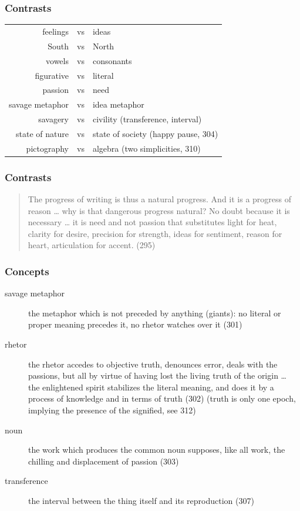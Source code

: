\documentclass[xcolor=dvipsnames]{beamer}
\begin{document}
\begin{frame}
  \frametitle{Contrasts}
  \begin{tabular}{rcl}
      feelings & vs & ideas \\
      South & vs & North \\
      vowels & vs & consonants \\
      figurative & vs & literal \\
      passion & vs & need \\
      savage metaphor & vs & idea metaphor \\
      savagery & vs & civility (transference, interval) \\
      state of nature & vs & state of society (happy pause, 304) \\
      pictography & vs & algebra (two simplicities, 310) \\
  \end{tabular}
\end{frame}

\begin{frame}
  \frametitle{Contrasts}
  \begin{quote}
    The progress of writing is thus a natural progress. And it is a
    progress of reason {\ldots} why is that dangerous progress
    natural? No doubt because it is necessary {\ldots} it is need and
    not passion that substitutes light for heat, clarity for desire,
    precision for strength, ideas for sentiment, reason for heart,
    articulation for accent. (295)
  \end{quote}  
\end{frame}

\begin{frame}
  \frametitle{Concepts}
  \begin{description}
  \item[savage metaphor] the metaphor which is not preceded by
    anything (giants): no literal or proper meaning precedes it, no
    rhetor watches over it (301)
    \item[rhetor] the rhetor accedes to objective truth, denounces
      error, deals with the passions, but all by virtue of having lost
      the living truth of the origin {\ldots} the enlightened spirit
      stabilizes the literal meaning, and does it by a process of
      knowledge and in terms of truth (302) (truth is only one epoch,
      implying the presence of the signified, see 312)
    \item[noun] the work which produces the common noun supposes, like
      all work, the chilling and displacement of passion (303)
    \item[transference] the interval between the thing itself and its
      reproduction (307)
  \end{description}
\end{frame}
\end{document}
